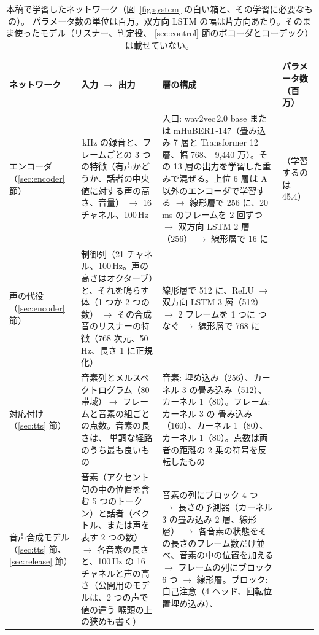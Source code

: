 \documentclass[10pt,a4paper,twocolumn]{article}
\begin{document}
\begin{table}[t]
\centering\footnotesize\setlength{\tabcolsep}{4pt}
\caption{本稿で学習したネットワーク（図~\ref{fig:system} の白い箱と、その学習に必要なもの）。
パラメータ数の単位は百万。双方向 LSTM の幅は片方向あたり。そのまま使ったモデル（リスナー、判定役、
\ref{sec:control} 節のボコーダとコーデック）は載せていない。}
\label{tab:models}
\begin{tabular}{@{}>{\raggedright\arraybackslash}p{20mm}>{\raggedright\arraybackslash}p{56mm}>{\raggedright\arraybackslash}p{74mm}>{\raggedright\arraybackslash}p{17mm}@{}}
\toprule
ネットワーク & 入力 $\rightarrow$ 出力 & 層の構成 & パラメータ数（百万）\\
\midrule
エンコーダ（\ref{sec:encoder} 節）
& 16\,kHz の録音と、フレームごとの 3 つの特徴（有声かどうか、話者の中央値に対する声の高さ、音量）
$\rightarrow$ 16 チャネル、100\,Hz
& 入口: wav2vec\,2.0 base または mHuBERT-147（畳み込み 7 層と Transformer 12 層、幅 768、
9,440 万）。その 13 層の出力を学習した重みで混ぜる。上位 6 層は A 以外のエンコーダで学習する
$\rightarrow$ 線形層で 256 に、20\,ms のフレームを 2 回ずつ $\rightarrow$ 双方向 LSTM 2 層（256）
$\rightarrow$ 線形層で 16 に
& 97.2（学習するのは 45.4）\\
\addlinespace[2pt]
声の代役（\ref{sec:encoder} 節）
& 制御列（21 チャネル、100\,Hz。声の高さはオクターブ）と、それを鳴らす体（1 つか 2 つの数）
$\rightarrow$ その合成音のリスナーの特徴（768 次元、50\,Hz、長さ 1 に正規化）
& 線形層で 512 に、ReLU $\rightarrow$ 双方向 LSTM 3 層（512）$\rightarrow$ 2 フレームを 1 つに
つなぐ $\rightarrow$ 線形層で 768 に
& 18.4\\
\addlinespace[2pt]
対応付け（\ref{sec:tts} 節）
& 音素列とメルスペクトログラム（80 帯域）$\rightarrow$ フレームと音素の組ごとの点数。音素の長さは、
単調な経路のうち最も良いもの
& 音素: 埋め込み（256）、カーネル 3 の畳み込み（512）、カーネル 1（80）。フレーム: カーネル 3 の
畳み込み（160）、カーネル 1（80）、カーネル 1（80）。点数は両者の距離の 2 乗の符号を反転したもの~\cite{ota}
& 0.5\\
\addlinespace[2pt]
音声合成モデル（\ref{sec:tts} 節、\ref{sec:release} 節）
& 音素（アクセント句の中の位置を含む 5 つのトークン）と話者（ベクトル、または声を表す 2 つの数）
$\rightarrow$ 各音素の長さと、100\,Hz の 16 チャネルと声の高さ（公開用のモデルは、2 つの声で値の違う
喉頭の上の狭めも書く）
& 音素の列にブロック 4 つ $\rightarrow$ 長さの予測器（カーネル 3 の畳み込み 2 層、線形層）
$\rightarrow$ 各音素の状態をその長さのフレーム数だけ並べ、音素の中の位置を加える $\rightarrow$
フレームの列にブロック 6 つ $\rightarrow$ 線形層。ブロック: 自己注意（4 ヘッド、回転位置埋め込み）、

\end{tabular}
\end{table}
\end{document}
